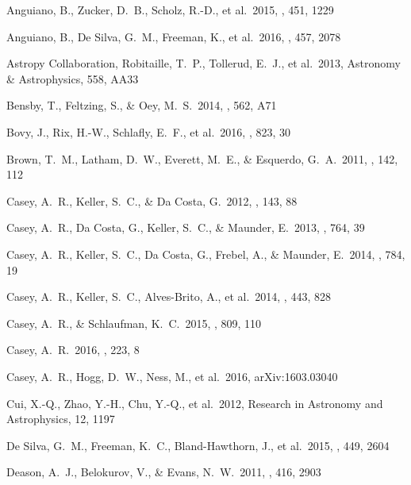 \documentclass[preprint,trackchanges]{aastex}
\begin{document}
\begin{thebibliography}{dummy}
 Anguiano, B., Zucker, D.~B., Scholz, R.-D., et al.\ 2015, \mnras, 451, 1229 

 Anguiano, B., De Silva, G.~M., Freeman, K., et al.\ 2016, \mnras, 457, 2078 

 Astropy Collaboration, Robitaille, T.~P., Tollerud, E.~J., et al.\ 2013, Astronomy \& Astrophysics, 558, AA33

 Bensby, T., Feltzing, S., \& Oey, M.~S.\ 2014, \aap, 562, A71 

 Bovy, J., Rix, H.-W., Schlafly, E.~F., et al.\ 2016, \apj, 823, 30 

 Brown, T.~M., Latham, D.~W., Everett, M.~E., \& Esquerdo, G.~A.\ 2011, \aj, 142, 112 

 Casey, A.~R., Keller, S.~C., \& Da Costa, G.\ 2012, \aj, 143, 88 

 Casey, A.~R., Da Costa, G., Keller, S.~C., \& Maunder, E.\ 2013, \apj, 764, 39 

 Casey, A.~R., Keller, S.~C., Da Costa, G., Frebel, A., \& Maunder, E.\ 2014, \apj, 784, 19 

 Casey, A.~R., Keller, S.~C., Alves-Brito, A., et al.\ 2014, \mnras, 443, 828 

 Casey, A.~R., \& Schlaufman, K.~C.\ 2015, \apj, 809, 110 

 Casey, A.~R.\ 2016, \apjs, 223, 8 

 Casey, A.~R., Hogg, D.~W., Ness, M., et al.\ 2016, arXiv:1603.03040 

 Cui, X.-Q., Zhao, Y.-H., Chu, Y.-Q., et al.\ 2012, Research in Astronomy and Astrophysics, 12, 1197 

 De Silva, G.~M., Freeman, K.~C., Bland-Hawthorn, J., et al.\ 2015, \mnras, 449, 2604 

 Deason, A.~J., Belokurov, V., \& Evans, N.~W.\ 2011, \mnras, 416, 2903 


\end{thebibliography}
\end{document}
